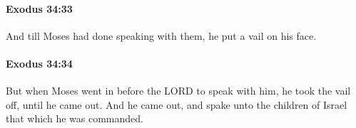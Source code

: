 		\paragraph{Exodus 34:33} %
			\label{EXODUS-34-33}

			And till Moses had done speaking with them, he put a vail on his face.


		\paragraph{Exodus 34:34} %
			\label{EXODUS-34-34}

			But when Moses went in before the LORD to speak with him, he took the vail off, until he came out. And he came out, and spake unto the children of Israel that which he was commanded.


